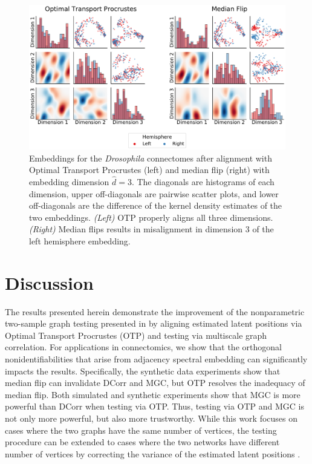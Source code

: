 \begin{figure}[t!]
    \centering
    \includegraphics[width=\linewidth]{figures/nonpar/figure3.pdf}
    \caption[Embeddings for the \textit{Drosophila} connectomes after alignment with Optimal Transport Procrustes (left) and median flip (right) with embedding dimension $\hat d =3$]
    {Embeddings for the \textit{Drosophila} connectomes after alignment with Optimal Transport Procrustes (left) and median flip (right) with embedding dimension $\hat d =3$. The diagonals are histograms of each dimension, upper off-diagonals are pairwise scatter plots, and lower off-diagonals are the difference of the kernel density estimates of the two embeddings. 
    \textit{(Left)} OTP properly aligns all three dimensions. 
    \textit{(Right)} Median flips results in misalignment in dimension 3 of the left hemisphere embedding. 
    }
    \label{fig:drosophila}
\end{figure}


\section{Discussion}

The results presented herein demonstrate the improvement of the nonparametric two-sample graph testing presented in \cite{tang2014nonparametric} by aligning estimated latent positions via Optimal Transport Procrustes (OTP) and testing via multiscale graph correlation. For applications in connectomics, we show that the orthogonal nonidentifiabilities that arise from adjacency spectral embedding can significantly impacts the results. Specifically, the synthetic data experiments show that median flip can invalidate DCorr and MGC, but OTP resolves the inadequacy of median flip. Both simulated and synthetic experiments show that MGC is more powerful than DCorr when testing via OTP.  Thus, testing via OTP and MGC is not only more powerful, but also more trustworthy. While this work focuses on cases where the two graphs have the same number of vertices, the testing procedure can be extended to cases where the two networks have different number of vertices by correcting the variance of the estimated latent positions \cite{correcting-nonpar}.


